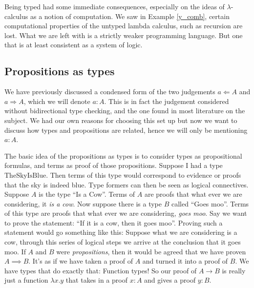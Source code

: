 Being typed had some immediate consequences, especially on the ideas of $\lambda$-calculus as a notion of computation. We saw in Example \ref{y_comb}, certain computational properties of the untyped lambda calculus, such as recursion are lost. What we are left with is a strictly weaker programming language. But one that is at least consistent as a system of logic.



\subsection{Propositions as types}

We have previously discussed a condensed form of the two judgements $a \Leftarrow A$ and $a \Rightarrow A$, which we will denote $a : A$. This is in fact the judgement considered without bidirectional type checking, and the one found in most literature on the subject. We had our own reasons for choosing this set up but now we want to discuss how types and propositions are related, hence we will only be mentioning $a : A$.

The basic idea of the propositions as types is to consider types as propositional formulas, and terms as proof of those propositions. Suppose I had a type $\mathrm{TheSkyIsBlue}$. Then terms of this type would correspond to evidence or proofs that the sky is indeed blue. Type formers can then be seen as logical connectives. Suppose $A$ is the type ``Is a Cow''. Terms of $A$ are proofs that what ever we are considering, it \emph{is a cow}. Now suppose there is a type $B$ called ``Goes moo''. Terms of this type are proofs that what ever we are considering, \emph{goes moo}. Say we want to prove the statement: ``If it is a cow, then it goes moo''.
Proving such a statement would go something like this: Suppose what we are considering is a cow, through this series of logical steps we arrive at the conclusion that it goes moo.
If $A$ and $B$ were \emph{propositions}, then it would be agreed that we have proven $A \implies B$. It's as if we have taken a proof of $A$ and turned it into a proof of $B$. We have types that do exactly that: Function types!
So our proof of $A \to B$ is really just a function $\lambda x . y$ that takes in a proof $x : A$ and gives a proof $y : B$.

